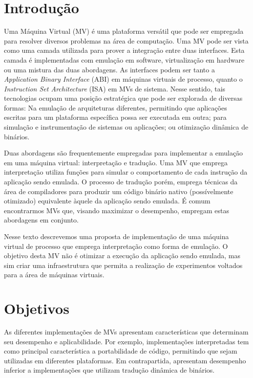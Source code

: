 \documentclass[11pt,twoside]{article}
\begin{document}
\section{Introdução}
Uma Máquina Virtual (MV) é uma plataforma versátil que pode ser empregada para resolver diversos problemas na área de computação. 
Uma MV pode ser vista como uma camada utilizada para prover a integração entre duas interfaces. Esta camada é implementadas com emulação em software, virtualização em hardware ou uma mistura das duas abordagens.
As interfaces podem ser tanto a \emph{Application Binary Interface} (ABI) em máquinas virtuais de processo, quanto o \emph{Instruction Set Architecture} (ISA) em MVs de sistema.
Nesse sentido, tais tecnologias ocupam uma posição estratégica que pode ser explorada de diversas formas:
Na emulação de arquiteturas diferentes, permitindo que aplicações escritas para um plataforma específica possa ser executada em outra; para simulação e instrumentação de sistemas ou aplicações; ou otimização dinâmica de binários.

Duas abordagens são frequentemente empregadas para implementar a emulação em uma máquina virtual: interpretação e tradução.
Uma MV que emprega interpretação utiliza funções para simular o comportamento de cada instrução da aplicação sendo emulada. 
O processo de tradução porém, emprega técnicas da área de compiladores para produzir um código binário nativo (possívelmente otimizado) equivalente àquele da aplicação sendo emulada.
É comum encontrarmos MVs que, visando maximizar o desempenho, empregam estas abordagens em conjunto.

Nesse texto descrevemos uma proposta de implementação de uma máquina virtual de processo que emprega interpretação como forma de emulação. 
O objetivo desta MV não é otimizar a execução da aplicação sendo emulada, mas sim criar uma infraestrutura que permita a realização de experimentos voltados para a área de máquinas virtuais.
   
\section{Objetivos}
As diferentes implementações de MVs apresentam características que determinam seu desempenho e aplicabilidade.
Por exemplo, implementações interpretadas tem como principal característica a portabilidade de código, permitindo que sejam utilizadas em diferentes plataformas. 
Em contrapartida, apresentam desempenho inferior a implementações que utilizam tradução dinâmica de binários.
\end{document}
